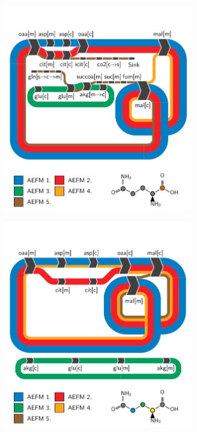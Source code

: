 \documentclass[varwidth]{standalone}
\begin{document}
\begin{figure}
\begin{subfigure}[t]{0.495\textwidth}
        \includegraphics[width=0.9\textwidth,trim={0.0cm 0.0cm 0.0cm 1.0cm},clip]{subpanels-c-f/glutamine/carbon-1/04-add-labels/add-labels.pdf}
    \end{subfigure}
    \begin{subfigure}[t]{0.495\textwidth}
        \vspace*{-2ex}
        \caption{}
        \centering
        \includegraphics[width=0.9\textwidth,trim={0.0cm 0.0cm 0.0cm 1.0cm},clip]{subpanels-c-f/glutamine/carbon-2-3-4/04-add-labels/add-labels.pdf}

\end{subfigure}
\end{figure}
\end{document}
